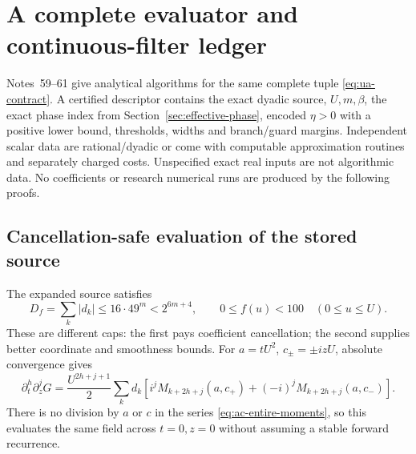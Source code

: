 \section{A complete evaluator and continuous-filter ledger}
\label{sec:complete-evaluation}
Notes~59--61 \cite{n59,n60,n61} give analytical algorithms for the
same complete tuple \eqref{eq:ua-contract}. A certified descriptor
contains the exact dyadic source, $U,m,\beta$, the exact phase index
from Section~\ref{sec:effective-phase}, encoded $\eta>0$ with a positive
lower bound, thresholds, widths and branch/guard margins. Independent
scalar data are rational/dyadic or come with computable approximation
routines and separately charged costs. Unspecified exact real inputs
are not algorithmic data. No coefficients or research numerical runs
are produced by the following proofs.

\subsection{Cancellation-safe evaluation of the stored source}
The expanded source satisfies
\begin{equation}
 D_f=\sum_k|d_k|\le16\cdot49^m<2^{6m+4},\qquad
 0\le f(u)<100\quad(0\le u\le U).
 \label{eq:ev-source-caps}
\end{equation}
These are different caps: the first pays coefficient cancellation;
the second supplies better coordinate and smoothness bounds.
For $a=tU^2$, $c_\pm=\pm izU$, absolute convergence gives
\begin{equation}
 \partial_t^h\partial_z^jG=\frac{U^{2h+j+1}}2\sum_kd_k
 [i^jM_{k+2h+j}(a,c_+)+(-i)^jM_{k+2h+j}(a,c_-)].
 \label{eq:ev-jets}
\end{equation}
There is no division by $a$ or $c$ in the series
\eqref{eq:ac-entire-moments}, so this evaluates the same field across
$t=0,z=0$ without assuming a stable forward recurrence.

